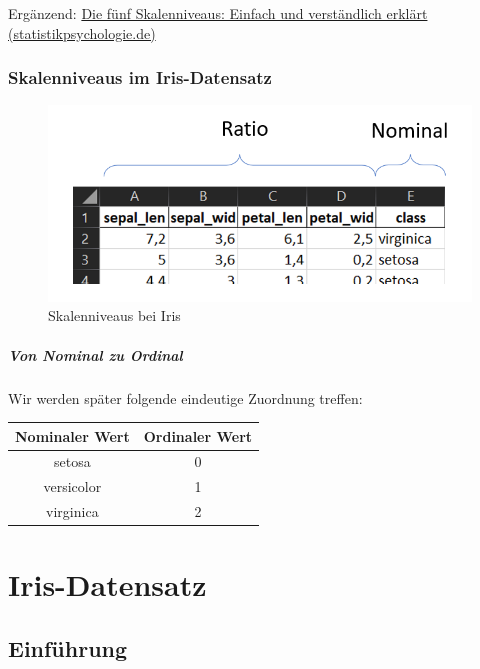 \documentclass[
  oneside]{book}
\theoremstyle{definition}
\theoremstyle{definition}
\theoremstyle{definition}
\theoremstyle{definition}
\theoremstyle{remark}
\begin{document}
Ergänzend: \href{https://www.statistikpsychologie.de/skalenniveaus/}{Die fünf Skalenniveaus: Einfach und verständlich erklärt (statistikpsychologie.de)}

\hypertarget{skalenniveaus-im-iris-datensatz-1}{%
\subsection{Skalenniveaus im Iris-Datensatz}\label{skalenniveaus-im-iris-datensatz-1}}

\begin{figure}
\centering
\includegraphics{assets/daten.assets/image-20211209145313372.png}
\caption{Skalenniveaus bei Iris}
\end{figure}

\hypertarget{von-nominal-zu-ordinal-1}{%
\paragraph{Von Nominal zu Ordinal}\label{von-nominal-zu-ordinal-1}}

Wir werden später folgende eindeutige Zuordnung treffen:

\begin{longtable}[]{@{}cc@{}}
\toprule
Nominaler Wert & Ordinaler Wert \\
\midrule
\endhead
setosa & 0 \\
versicolor & 1 \\
virginica & 2 \\
\bottomrule
\end{longtable}

\hypertarget{iris-datensatz}{%
\chapter{Iris-Datensatz}\label{iris-datensatz}}

\hypertarget{einfuxfchrung}{%
\section{Einführung}\label{einfuxfchrung}}
\end{document}
